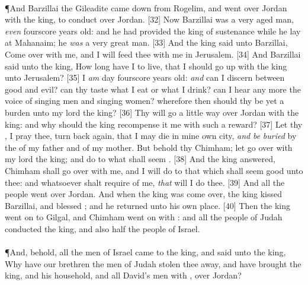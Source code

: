 \\
\P \textcolor[cmyk]{0.99998,1,0,0}{And Barzillai the Gileadite came down from Rogelim, and went over Jordan with the king, to conduct  over Jordan.}
[32] \textcolor[cmyk]{0.99998,1,0,0}{Now Barzillai was a very aged man, \emph{even} fourscore years old: and he had provided the king of sustenance while he lay at Mahanaim;  he \emph{was} a very great man.}
[33] \textcolor[cmyk]{0.99998,1,0,0}{And the king said unto Barzillai, Come  over with me, and I will feed thee with me in Jerusalem.}
[34] \textcolor[cmyk]{0.99998,1,0,0}{And Barzillai said unto the king, How long have I to live, that I should go up with the king unto Jerusalem?}
[35] \textcolor[cmyk]{0.99998,1,0,0}{I \emph{am}  day fourscore years old: \emph{and} can I discern between good and evil? can thy  taste what I eat or what I drink? can I hear any more the voice of singing men and singing women? wherefore then should thy  be yet a burden unto my lord the king?}
[36] \textcolor[cmyk]{0.99998,1,0,0}{Thy  will go a little way over Jordan with the king: and why should the king recompense it me with such a reward?}
[37] \textcolor[cmyk]{0.99998,1,0,0}{Let thy , I pray thee, turn back again, that I may die in mine own city, \emph{and} \emph{be} \emph{buried} by the  of my father and of my mother. But behold thy  Chimham; let  go over with my lord the king; and do to  what shall seem .}
[38] \textcolor[cmyk]{0.99998,1,0,0}{And the king answered, Chimham shall go over with me, and I will do to  that which shall seem good unto thee: and whatsoever  shalt require of me, \emph{that} will I do  thee.}
[39] \textcolor[cmyk]{0.99998,1,0,0}{And all the people went over Jordan. And when the king was come over, the king kissed Barzillai, and blessed ; and he returned unto his own place.}
[40] \textcolor[cmyk]{0.99998,1,0,0}{Then the king went on to Gilgal, and Chimham went on with : and all the people of Judah conducted the king, and also half the people of Israel.}\\
\\
\P \textcolor[cmyk]{0.99998,1,0,0}{And, behold, all the men of Israel came to the king, and said unto the king, Why have our brethren the men of Judah stolen thee away, and have brought the king, and his household, and all David's men with , over Jordan?}
